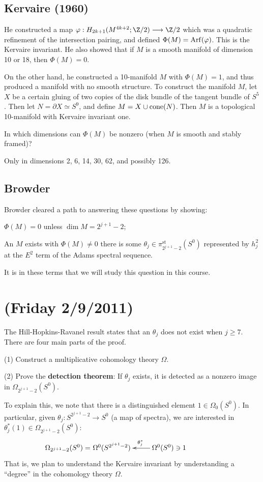 \documentclass[11pt]{article}
\newcommand{\NewLecture}[3]{\section{#1 {\small(#2/#3/2011)}}}
\begin{document}
\begin{FirstNineLectures}
\subsection*{Kervaire (1960)}He constructed a map
$\phi:H_{2k+1}(M^{4k+2};\Z/2)\to\Z/2$ which was a quadratic refinement of the
intersection pairing, and defined $\Phi(M)=\operatorname{Arf}(\varphi)$. This is the
Kervaire invariant. He also showed that if $M$ is a smooth manifold of dimension
10 or 18, then $\Phi(M)=0$.

On the other hand, he constructed a 10-manifold $M$ with $\Phi(M)=1$, and thus
produced a manifold with no smooth structure. To construct the manifold $M$, let
$X$ be a certain gluing of two copies of the disk bundle of the tangent bundle
of $S^5$. Then let $N=\partial X\simeq S^9$, and define $M=X\cup\operatorname{cone}(N)$. Then
$M$ is a topological 10-manifold with Kervaire invariant one.
\begin{question}
In which dimensions can $\Phi(M)$ be nonzero (when $M$ is smooth and stably
framed)?
\end{question}
\begin{answer}
Only in dimensions 2, 6, 14, 30, 62, and possibly 126. 
\end{answer}
\subsection*{Browder}
Browder cleared a path to answering these questions by showing:
\begin{itemise}
\item $\Phi(M)=0$ unless $\dim M=2^{j+1}-2$;
\item An $M$ exists with $\Phi(M)\neq0$ \Iff there is some
$\theta_j\in\pi_{2^{j+1}-2}^\text{st}(S^0)$ represented by $h_j^2$ at the $E^2$
term of the Adams spectral sequence.
\end{itemise}
It is in these terms that we will study this question in this course.
\NewLecture{}{Friday 2}{9}
The Hill-Hopkins-Ravanel result states that an $\theta_j$ does not exist when $j\geq7$. There are
four main parts of the proof.
\begin{itemise}
\item[(1)] Construct a multiplicative cohomology theory $\Omega$.
\item[(2)] Prove the \textbf{detection theorem}: If $\theta_j$ exists, it is
detected as a nonzero image in $\Omega_{2^{j+1}-2}(S^0)$.

\INDENT To explain this, we note that there is a distinguished element
$1\in\Omega_0(S^0)$. In particular, given $\theta_j:S^{2^{j+1}-2}\to S^0$ (a map
of spectra), we are interested in $\theta_j^*(1)\in\Omega_{2^{j+1}-2}(S^0)$:
\[\qquad\xymatrix{
\makebox[0cm][r]{$\Omega_{2^{j+1}-2}(S^0)=$\ }\Omega^0(S^{2^{j+1}-2})&
\ar[l]_{\theta_j^*}\Omega^0(S^{0})\ni 1
}\]
That is, we plan to understand the Kervaire invariant by understanding a
``degree'' in the cohomology theory $\Omega$.


\end{itemise}
\end{FirstNineLectures}
\end{document}
